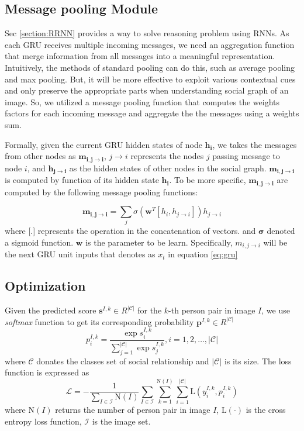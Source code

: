 \documentclass{article}
\begin{document}
\subsection{Message pooling Module} \label{section:mp}

Sec \ref{section:RRNN} provides a way to solve reasoning problem using RNNs. As each GRU receives multiple incoming messages, we need an aggregation function that merge information from all messages into a meaningful representation. Intuitively, the methods of standard pooling  can do this, such as average pooling and max pooling. But, it will be more effective to exploit various contextual cues and only preserve the appropriate parts when understanding social graph of an image. So, we utilized a message pooling function that computes the weights factors for each incoming message and aggregate the the messages using a weights sum.

Formally, given the current GRU hidden states of node $\bm{h_i}$, we takes the messages from other nodes as $\bm{m_{i,j \to i}}$, $j \to i$ represents the nodes $j$ passing message to node $i$, and $\bm{h_{j \to i}}$ as the hidden states of other nodes in the social graph. $\bm{m_{i,j \to i}}$ is computed by function of its hidden state $\bm{h_i}$. To be more specific, $\bm{m_{i, j \to i}}$ are computed by the following message pooling functions:

\begin{equation}
	\bm{m_{i,j \to i}} = \sum_{j} \sigma{(\bm{w}^T[h_i,h_{j \to i}])h_{j \to i}}	
\end{equation}
where [.] represents the operation in the concatenation of vectors. and $\bm{\sigma}$ denoted a sigmoid function. $\bm{w}$ is the parameter to be learn. Specifically, $m_{i, j \to i}$ will be the next GRU unit inputs that denotes as $x_{t}$ in equation \ref{eq:gru}

\subsection{Optimization}

Given the predicted score $\mathbf{s}^{I,k} \in R^{|\mathcal{C}|}$ for the $k$-th person pair in image $I$, we use {\it softmax} function to get its corresponding probability $\mathbf{p}^{I,k} \in R^{|\mathcal{C}|}$
\begin{equation}
  \label{eq:prob_eq}
  p_i^{I,k} = \frac{\exp{s_i^{I,k}}}{\sum_{j=1}^{|\mathcal{C}|}{\exp{s_j^{I,k}}}}, i=1,2,\dots,|\mathcal{C}|
\end{equation}
where $\mathcal{C}$ donates the classes set of social relationship and $|\mathcal{C}|$ is its size. The loss function is expressed as
\begin{equation}
  \label{eq:loss_eq}
  \mathcal{L} = - \frac{1}{\sum_{I \in \mathcal{I}}\text{N}(I)} \sum_{I \in \mathcal{I}} \sum_{k=1}^{\text{N}(I)} \sum_{i=1}^{|\mathcal{C}|} \text{L}(y_{i}^{I,k}, p_{i}^{I,k})
\end{equation}
where $\text{N}(I)$ returns the number of person pair in image $I$, $\text{L}(\cdot)$ is the cross entropy loss function, $\mathcal{I}$ is the image set.
\end{document}
